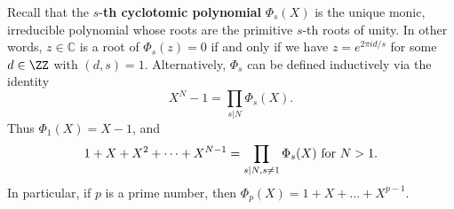 Recall that the $s$-\textbf{th cyclotomic polynomial} $\Phi_s (X)$ is the unique monic, irreducible polynomial whose roots are the primitive $s$-th roots of unity.
In other words, $z\in\mathbb{C}$ is a root of $\Phi_s(z)=0$ if and only if we have $z=e^{2\pi i d/s}$ for some $d\in\ZZ$ with $(d,s)=1$. 
Alternatively, $\Phi_s$ can be defined inductively via the identity
\begin{equation}\label{poly-e0}
X^N-1=\prod_{s|N}\Phi_s(X).
\end{equation}
Thus $\Phi_1(X)=X-1$, and 
\begin{equation}\label{polysec-e0}
1+X+X^2+\dots+X^{N-1}=\prod_{s|N,s\neq 1}\Phi_s(X)\hbox{ for }N>1.
\end{equation} 
In particular, if $p$ is a prime number, then $\Phi_p(X)=1+X+\dots+X^{p-1}$.
